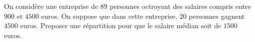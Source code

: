 
\begin{exercice}\label{exoSeconde-0016}

On considère une entreprise de \( 89\) personnes octroyant des salaires compris entre $900$ et $4500$ euros. On suppose que dans cette entreprise, $20$ personnes gagnent $4500$ euros. Proposer une répartition pour que le salaire médian soit de $1500$ euros.

\end{exercice}
